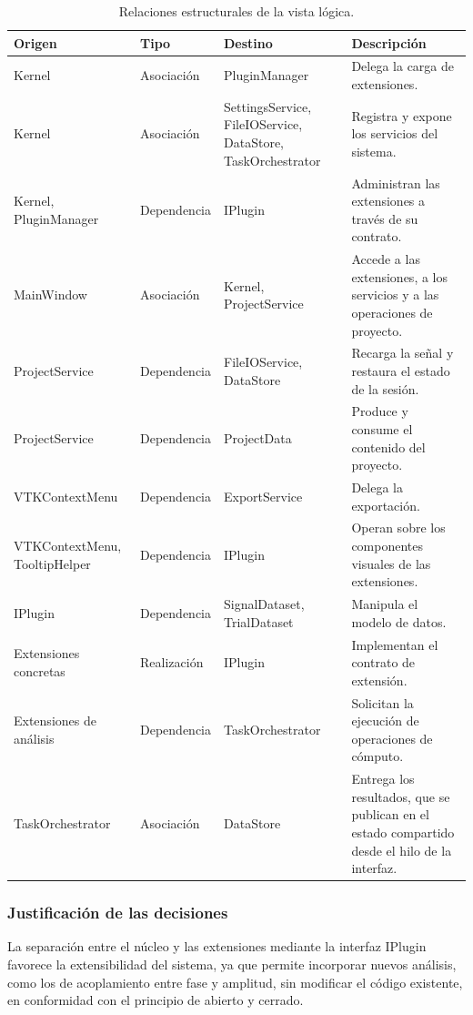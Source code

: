 \documentclass[11pt,a4paper]{article}
\DeclareRobustCommand{\_}{\textunderscore\allowbreak}
\begin{document}
\begin{table}[H]
\centering
\caption{Relaciones estructurales de la vista lógica.}
\label{tab:relaciones_logica}
\begin{tabularx}{\linewidth}{@{}p{4.4cm}p{2.6cm}p{3.3cm}X@{}}
\toprule
\textbf{Origen} & \textbf{Tipo} & \textbf{Destino} & \textbf{Descripción} \\
\midrule
Kernel & Asociación & PluginManager & Delega la carga de extensiones. \\
Kernel & Asociación & SettingsService, FileIOService, DataStore, TaskOrchestrator & Registra y expone los servicios del sistema. \\
Kernel, PluginManager & Dependencia & IPlugin & Administran las extensiones a través de su contrato. \\
MainWindow & Asociación & Kernel, ProjectService & Accede a las extensiones, a los servicios y a las operaciones de proyecto. \\
ProjectService & Dependencia & FileIOService, DataStore & Recarga la señal y restaura el estado de la sesión. \\
ProjectService & Dependencia & ProjectData & Produce y consume el contenido del proyecto. \\
VTKContextMenu & Dependencia & ExportService & Delega la exportación. \\
VTKContextMenu, TooltipHelper & Dependencia & IPlugin & Operan sobre los componentes visuales de las extensiones. \\
IPlugin & Dependencia & SignalDataset, TrialDataset & Manipula el modelo de datos. \\
Extensiones concretas & Realización & IPlugin & Implementan el contrato de extensión. \\
Extensiones de análisis & Dependencia & TaskOrchestrator & Solicitan la ejecución de operaciones de cómputo. \\
TaskOrchestrator & Asociación & DataStore & Entrega los resultados, que se publican en el estado compartido desde el hilo de la interfaz. \\
\bottomrule
\end{tabularx}
\end{table}


\subsubsection{Justificación de las decisiones}

La separación entre el núcleo y las extensiones mediante la interfaz IPlugin favorece la extensibilidad del sistema, ya que permite incorporar nuevos análisis, como los de acoplamiento entre fase y amplitud, sin modificar el código existente, en conformidad con el principio de abierto y cerrado.
\end{document}
